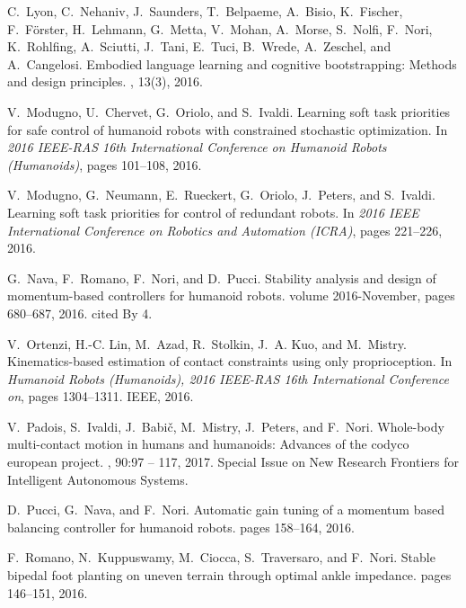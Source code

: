 \documentclass[12pt,a4paper,twoside]{article}
\begin{document}
\begin{thebibliography}{}
C.~Lyon, C.~Nehaniv, J.~Saunders, T.~Belpaeme, A.~Bisio, K.~Fischer,
  F.~F{\"o}rster, H.~Lehmann, G.~Metta, V.~Mohan, A.~Morse, S.~Nolfi, F.~Nori,
  K.~Rohlfing, A.~Sciutti, J.~Tani, E.~Tuci, B.~Wrede, A.~Zeschel, and
  A.~Cangelosi.
\newblock Embodied language learning and cognitive bootstrapping: Methods and
  design principles.
, 13(3), 2016.
 

V.~Modugno, U.~Chervet, G.~Oriolo, and S.~Ivaldi.
\newblock Learning soft task priorities for safe control of humanoid robots
  with constrained stochastic optimization.
\newblock In {\em 2016 IEEE-RAS 16th International Conference on Humanoid
  Robots (Humanoids)}, pages 101--108, 2016.

V.~Modugno, G.~Neumann, E.~Rueckert, G.~Oriolo, J.~Peters, and S.~Ivaldi.
\newblock Learning soft task priorities for control of redundant robots.
\newblock In {\em 2016 IEEE International Conference on Robotics and Automation
  (ICRA)}, pages 221--226, 2016.

G.~Nava, F.~Romano, F.~Nori, and D.~Pucci.
\newblock Stability analysis and design of momentum-based controllers for
  humanoid robots.
\newblock volume 2016-November, pages 680--687, 2016.
\newblock cited By 4.

V.~Ortenzi, H.-C. Lin, M.~Azad, R.~Stolkin, J.~A. Kuo, and M.~Mistry.
\newblock Kinematics-based estimation of contact constraints using only
  proprioception.
\newblock In {\em Humanoid Robots (Humanoids), 2016 IEEE-RAS 16th International
  Conference on}, pages 1304--1311. IEEE, 2016.

V.~Padois, S.~Ivaldi, J.~Babi{\v c}, M.~Mistry, J.~Peters, and F.~Nori.
\newblock Whole-body multi-contact motion in humans and humanoids: Advances of
  the codyco european project.
, 90:97 -- 117, 2017.
\newblock Special Issue on New Research Frontiers for Intelligent Autonomous
  Systems.

D.~Pucci, G.~Nava, and F.~Nori.
\newblock Automatic gain tuning of a momentum based balancing controller for
  humanoid robots.
\newblock pages 158--164, 2016.
 

F.~Romano, N.~Kuppuswamy, M.~Ciocca, S.~Traversaro, and F.~Nori.
\newblock Stable bipedal foot planting on uneven terrain through optimal ankle
  impedance.
\newblock pages 146--151, 2016.


\end{thebibliography}
\end{document}
